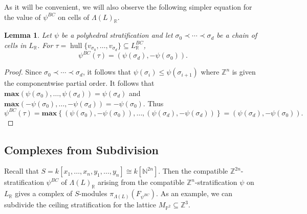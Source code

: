 \documentclass{amsart}
\newcommand{\NN}{\mathbb{N}}
\newcommand{\ZZ}{\mathbb{Z}}
\newcommand{\RR}{\mathbb{R}}
\newcommand{\field}{k}
\DeclareMathOperator{\hull}{hull}
\newtheorem{lemma}[theorem]{Lemma}
\theoremstyle{remark}
\begin{document}
As it will be convenient, we will also observe the following simpler equation for the value of $\psi^{BC}$ on cells of $\Lambda(L)_{\RR}$.
\begin{lemma}
  Let $\psi$ be a polyhedral stratification and let $\sigma_0\prec \cdots \prec \sigma_d$ be a chain of cells in $L_{\RR}$.
  For $\tau=\hull\{v_{\sigma_0},\ldots,v_{\sigma_d}\}\subseteq L_{\RR}^{BC}$,
  \[\psi^{BC}(\tau) = (\psi(\sigma_d),-\psi(\sigma_0)).\]
\end{lemma}
\begin{proof}
  Since $\sigma_0\prec \cdots \prec \sigma_d$, it follows that $\psi(\sigma_i)\leq \psi(\sigma_{i+1})$
  where $\ZZ^n$ is given the componentwise partial order.
  It follows that $\mathbf{max}(\psi(\sigma_0),\ldots,\psi(\sigma_d))=\psi(\sigma_d)$ and $\mathbf{max} (-\psi(\sigma_0), \ldots, -\psi(\sigma_d))=-\psi(\sigma_0)$. Thus
  \[\psi^{BC}(\tau) = \mathbf{max}\left\{(\psi(\sigma_0),-\psi(\sigma_0)), \ldots, (\psi(\sigma_d),-\psi(\sigma_d))\right\} = (\psi(\sigma_d),-\psi(\sigma_0)).\]
\end{proof}

\subsection*{Complexes from Subdivision}

Recall that $S=\field[x_1,\ldots,x_n,y_1,\ldots,y_n]\cong \field[\NN^{2n}]$.
Then the compatible $\ZZ^{2n}$-stratification $\psi^{BC}$ of $\Lambda(L)_{\RR}$ arising from the compatible $\ZZ^n$-stratification $\psi$ on $L_{\RR}$
gives a complex of $S$-modules $\pi_{\Lambda(L)}(F_{\psi^{BC}})$.
As an example, we can subdivide the ceiling stratification for the lattice $M_{\mathbb{P}^2}\subseteq \ZZ^{3}$.
\end{document}
